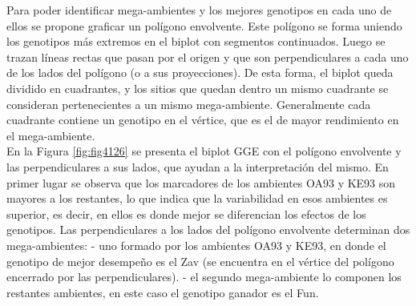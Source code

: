 \begin{itemize}[wide, nosep, labelindent = 0pt, topsep = 1ex, noitemsep,topsep=0pt]
Para poder identificar mega-ambientes y los mejores genotipos en cada uno de ellos se propone graficar un polígono envolvente. Este polígono se forma uniendo los genotipos más extremos en el biplot con segmentos continuados. Luego se trazan líneas rectas que pasan por el origen y que son perpendiculares a cada uno de los lados del polígono (o a sus proyecciones). De esta forma, el biplot queda dividido en cuadrantes, y los sitios que quedan dentro un mismo cuadrante se consideran pertenecientes a un mismo mega-ambiente. Generalmente cada cuadrante contiene un genotipo en el vértice, que es el de mayor rendimiento en el mega-ambiente.\\
En la Figura \ref{fig:fig4126} se presenta el biplot GGE con el polígono envolvente y las perpendiculares a sus lados, que ayudan a la interpretación del mismo.
En primer lugar se observa que los marcadores de los ambientes OA93 y KE93 son mayores a los restantes, lo que indica que la variabilidad en esos ambientes es superior, es decir, en ellos es donde mejor se diferencian los efectos de los genotipos.
Las perpendiculares a los lados del polígono envolvente determinan dos mega-ambientes:
- uno formado por los ambientes OA93 y KE93, en donde el genotipo de mejor desempeño es el Zav (se encuentra en el vértice del polígono encerrado por las perpendiculares).
- el segundo mega-ambiente lo componen los restantes ambientes, en este caso el genotipo ganador es el Fun.\\




\end{itemize}
